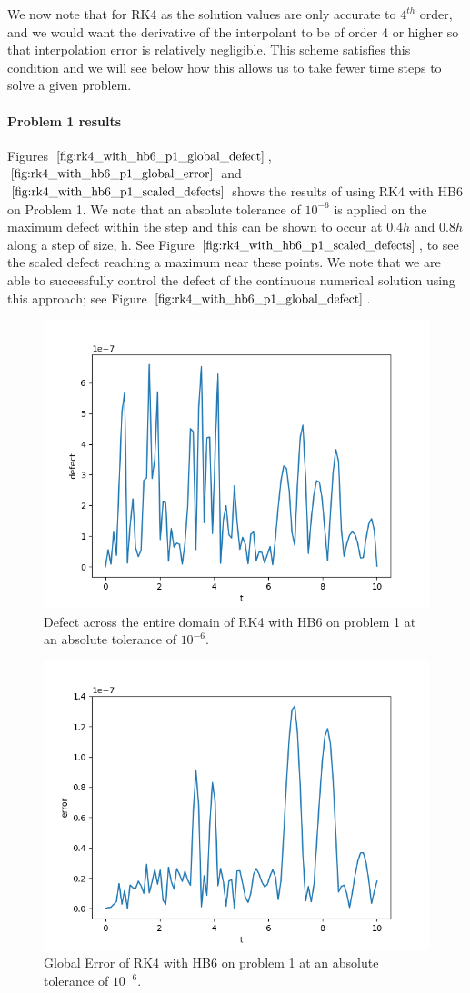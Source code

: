 \documentclass{article}
\begin{document}
We now note that for RK4 as the solution values are only accurate to $4^{th}$ order, and we would want the derivative of the interpolant to be of order 4 or higher so that interpolation error is relatively negligible. This scheme satisfies this condition and we will see below how this allows us to take fewer time steps to solve a given problem.

\paragraph{Problem 1 results}
Figures $\ref{fig:rk4_with_hb6_p1_global_defect}$, $\ref{fig:rk4_with_hb6_p1_global_error}$ and $\ref{fig:rk4_with_hb6_p1_scaled_defects}$ shows the results of using RK4 with HB6 on Problem 1. We note that an absolute tolerance of $10^{-6}$ is applied on the maximum defect within the step and this can be shown to occur at $0.4h$ and $0.8h$ along a step of size, h. See Figure $\ref{fig:rk4_with_hb6_p1_scaled_defects}$, to see the scaled defect reaching a maximum near these points. We note that we are able to successfully control the defect of the continuous numerical solution using this approach; see Figure $\ref{fig:rk4_with_hb6_p1_global_defect}$. 

\begin{figure}[H]
\centering
\includegraphics[width=0.7\linewidth]{./figures/rk4_with_hb6_p1_global_defect}
\caption{Defect across the entire domain of RK4 with HB6 on problem 1 at an absolute tolerance of $10^{-6}$.}
\label{fig:rk4_with_hb6_p1_global_defect}
\end{figure}

\begin{figure}[H]
\centering
\includegraphics[width=0.7\linewidth]{./figures/rk4_with_hb6_p1_global_error}
\caption{Global Error of RK4 with HB6 on problem 1 at an absolute tolerance of $10^{-6}$.}
\label{fig:rk4_with_hb6_p1_global_error}
\end{figure}
\end{document}
